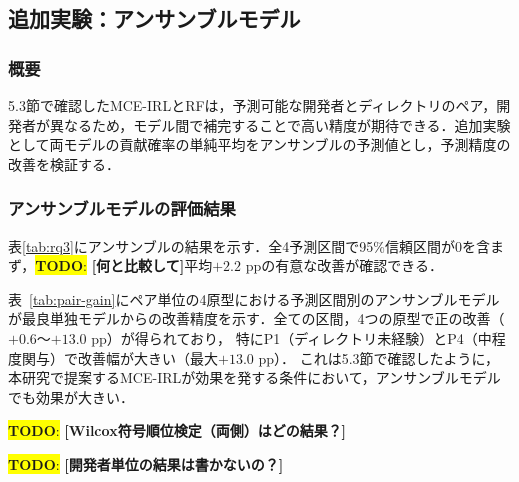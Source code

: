 \documentclass[submit,noauthor,ses,dvipdfmx]{ipsj}
\newcommand{\todo}[1]{\colorbox{yellow}{{\bf TODO}:}{\color{red} {\textbf{[#1]}}}}
\begin{document}



\subsection{追加実験：アンサンブルモデル}

\subsubsection{概要}
5.3節で確認したMCE-IRLとRFは，予測可能な開発者とディレクトリのペア，開発者が異なるため，モデル間で補完することで高い精度が期待できる．追加実験として両モデルの貢献確率の単純平均をアンサンブルの予測値とし，予測精度の改善を検証する．


\subsubsection{アンサンブルモデルの評価結果}

表\ref{tab:rq3}にアンサンブルの結果を示す．全4予測区間で95\%信頼区間が0を含まず，\todo{何と比較して}平均$+2.2$ ppの有意な改善が確認できる．

表~\ref{tab:pair-gain}にペア単位の4原型における予測区間別のアンサンブルモデルが最良単独モデルからの改善精度を示す．全ての区間，4つの原型で正の改善（$+0.6$～$+13.0$ pp）が得られており，
特にP1（ディレクトリ未経験）とP4（中程度関与）で改善幅が大きい（最大$+13.0$ pp）．
これは5.3節で確認したように，本研究で提案するMCE-IRLが効果を発する条件において，アンサンブルモデルでも効果が大きい．

\todo{Wilcox符号順位検定（両側）はどの結果？}

\todo{開発者単位の結果は書かないの？}
\end{document}
